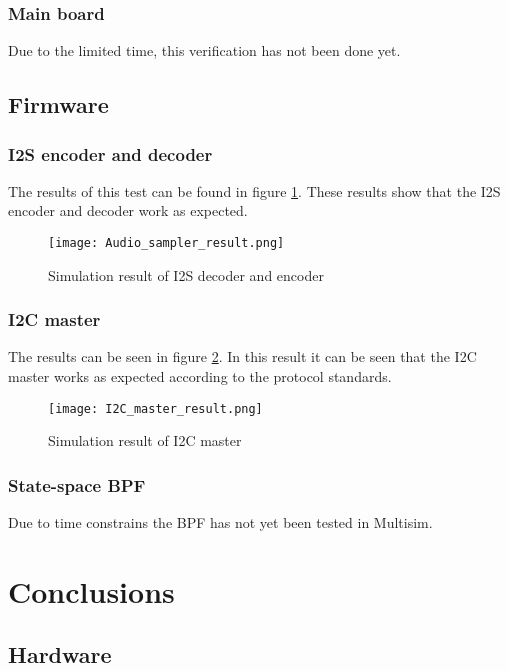 \subsubsection{Main board}
Due to the limited time, this verification has not been done yet.

\subsection{Firmware}
\subsubsection{I2S encoder and decoder}
The results of this test can be found in figure \ref{fig:i2s-dec-enc}. These results show that the I2S encoder and decoder work as expected. 

\begin{figure}[h!]
    \texttt{[image: Audio\_sampler\_result.png]}
    \caption{Simulation result of I2S decoder and encoder}
    \label{fig:i2s-dec-enc}
\end{figure}

\subsubsection{I2C master}
The results can be seen in figure \ref{fig:i2c-master}. In this result it can be seen that the I2C master works as expected according to the protocol standards.

\begin{figure}[h!]
    \texttt{[image: I2C\_master\_result.png]}
    \caption{Simulation result of I2C master}
    \label{fig:i2c-master}
\end{figure}

\subsubsection{State-space BPF}
Due to time constrains the BPF has not yet been tested in Multisim. 

\section{Conclusions}

\subsection{Hardware}

